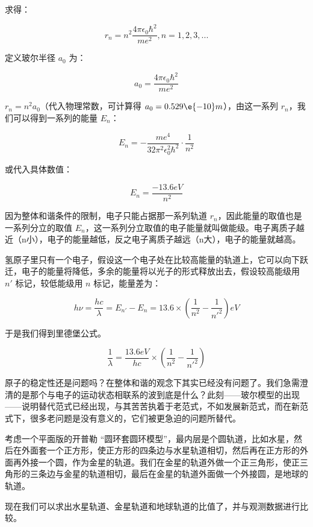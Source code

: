 求得：

\begin{equation}
r_n = n^2 \frac{4 \pi \epsilon_0 \hbar^2  }{ m e^2}, n = 1, 2, 3, ...
\end{equation}

定义玻尔半径 $a_0$ 为：

\begin{equation}
a_0 = \frac{4 \pi \epsilon_0 \hbar^2  }{ m e^2}
\end{equation}

$r_n = n^2 a_0$（代入物理常数，可计算得 $a_0 = 0.529\e{-10} m$），由这一系列 $r_n$，我们可以得到一系列的能量 $E_n$：

\begin{equation}
E_n = - \frac{m e^4 }{ 32 \pi^2 \epsilon_0^2 \hbar^2 } \cdot {\frac{1}{n^2}}
\end{equation}

或代入具体数值：

\begin{equation}
E_n = \frac{-13.6 eV}{n^2}
\end{equation}

因为整体和谐条件的限制，电子只能占据那一系列轨道 $r_n$，因此能量的取值也是一系列分立的取值 $E_n$，这一系列分立取值的电子能量就叫做能级。电子离质子越近（n小），电子的能量越低，反之电子离质子越远（n大），电子的能量就越高。

氢原子里只有一个电子，假设这一个电子处在比较高能量的轨道上，它可以向下跃迁，电子的能量将降低，多余的能量将以光子的形式释放出去，假设较高能级用 $n'$ 标记，较低能级用 $n$ 标记，能量差为：

\begin{equation}
h \nu = \frac{hc}{\lambda} = E_{n'} - E_n = 13.6 \times \left( \frac{1}{n^2}  - \frac{1}{n'^2} \right) eV 
\end{equation}

于是我们得到里德堡公式。

\begin{equation}
\frac{1}{\lambda } = \frac{13.6 eV}{hc} \times \left( \frac{1}{n^2}  - \frac{1}{n'^2} \right)
\end{equation}

原子的稳定性还是问题吗？在整体和谐的观念下其实已经没有问题了。我们急需澄清的是那个与电子的运动状态相联系的波到底是什么？此刻——玻尔模型的出现——说明替代范式已经出现，与其苦苦执着于老范式，不如发展新范式，而在新范式下，很多老问题是没有意义的，它们被更急迫的问题所替代。

\begin{exercise}{}
考虑一个平面版的开普勒 “圆环套圆环模型”，最内层是个圆轨道，比如水星，然后在外面套一个正方形，使正方形的四条边与水星轨道相切，然后再在正方形的外面再外接一个圆，作为金星的轨道。我们在金星的轨道外做一个正三角形，使正三角形的三条边与金星的轨道相切，最后在金星的轨道外面做一个外接圆，是地球的轨道。

现在我们可以求出水星轨道、金星轨道和地球轨道的比值了，并与观测数据进行比较。
\end{exercise}

